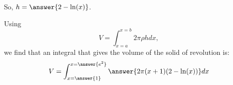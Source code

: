 \documentclass{ximera}
\begin{document}
\begin{exercise}
\begin{exercise}
\begin{exercise}
\begin{multipleChoice}
\end{multipleChoice}   

So, $h= \answer{2-\ln(x)}$.
 \end{exercise}
           
\begin{exercise}

Using \[V = \int_{x=a}^{x=b} 2\pi \rho h dx, \] we find that an integral that gives the volume of the solid of revolution is:            
	\[
	V= \int_{x=\answer{1}}^{x=\answer{e^2}}
	\answer{2\pi(x+1)(2-\ln(x))} dx
	\]
\end{exercise}
\end{exercise}
\end{exercise}
\end{document}
